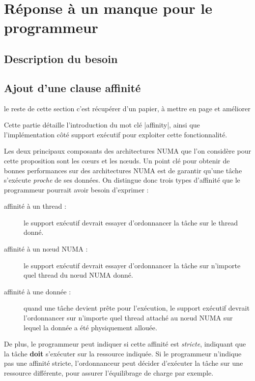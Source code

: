 
\section{Réponse à un manque pour le programmeur}
\subsection{Description du besoin}


\subsection{Ajout d'une clause affinité}

\begin{todo}
    le reste de cette section c'est récupérer d'un papier, à mettre en page et améliorer
\end{todo}

Cette partie détaille l'introduction du mot clé |affinity|, ainsi que l'implémentation côté support
exécutif pour exploiter cette fonctionnalité.

Les deux principaux composants des architectures NUMA que l'on considère pour
cette proposition sont les cœurs et les nœuds. Un point clé pour obtenir
de bonnes performances sur des architectures NUMA est de garantir qu'une tâche
s'exécute \emph{proche} de ses données.
On distingue donc trois types d'affinité que le programmeur pourrait avoir besoin
d'exprimer :

\begin{description}
    \item [affinité à un thread :]
      le support exécutif devrait essayer d'ordonnancer la tâche sur le thread donné.
    \item [affinité à un nœud NUMA :]
      le support exécutif devrait essayer d'ordonnancer la tâche sur n'importe
      quel thread du nœud NUMA donné.

    \item [affinité à une donnée :]
      quand une tâche devient prête pour l'exécution, le support exécutif devrait
      l'ordonnancer sur n'importe quel thread attaché au nœud NUMA sur lequel
      la donnée a été physiquement allouée.
\end{description}

De plus, le programmeur peut indiquer si cette affinité est \emph{stricte},
indiquant que la tâche \textbf{doit} s'exécuter sur la ressource indiquée.
Si le programmeur n'indique pas une affinité stricte, l'ordonnanceur peut décider
d'exécuter la tâche sur une ressource différente, pour assurer l'équilibrage de
charge par exemple.

